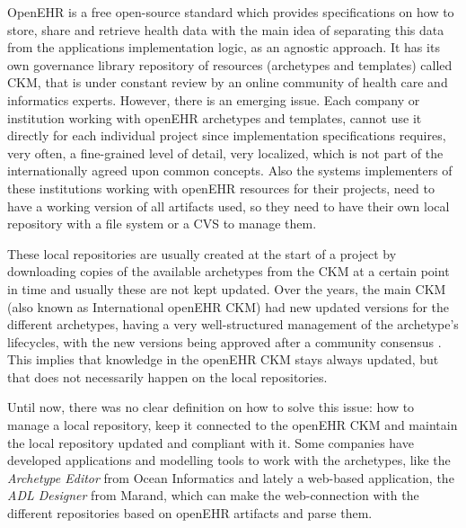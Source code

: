\documentclass[mim_thesis.tex]{subfiles}
\begin{document}
OpenEHR is a free open-source standard which provides specifications 
on how to store, share and retrieve health data with the main idea of separating this data from the applications implementation logic, as an agnostic approach. It has its own governance library repository of resources (archetypes and templates) called \ac{CKM}, that is under constant review by an online community of health care and informatics experts. However, there is an emerging issue. Each company or institution working with openEHR archetypes and templates, cannot use it directly for each individual project since implementation specifications requires, very often, a fine-grained level of detail, very localized, which is not part of the internationally agreed upon common concepts. Also the systems implementers of these institutions working with openEHR resources for their projects, need to have a working version of all artifacts used, so they need to have their own local repository with a file system or a \ac{CVS} to manage them.

These local repositories are usually created at the start of a project by downloading copies of the available archetypes from the CKM at a certain point in time and usually these are not kept updated. Over the years, the main CKM (also known as International openEHR CKM) had new updated versions for the different archetypes, having a very well-structured management of the archetype’s lifecycles, with the new versions being approved after a community consensus \citep{Leslie2017}. This implies that knowledge in the openEHR CKM stays always updated, but that does not necessarily happen on the local repositories. 

Until now, there was no clear definition on how to solve this issue: how to manage a local repository, keep it connected to the openEHR CKM and maintain the local repository updated and compliant with it. Some companies have developed applications and modelling tools to work with the archetypes, like the \textit{Archetype Editor} from Ocean Informatics and lately a web-based application, the \textit{ADL Designer} from Marand, which can make the web-connection with the different repositories based on openEHR artifacts and parse them. 
\end{document}
